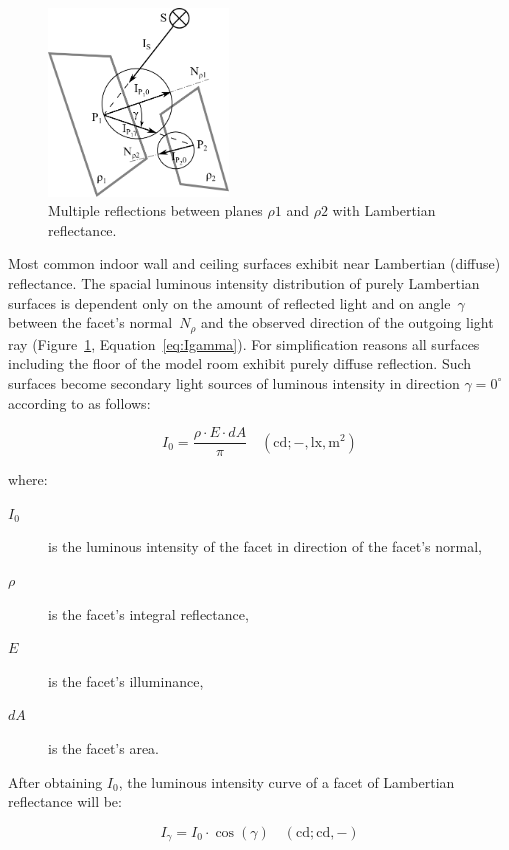 \begin{figure}[htb]
  \centering
  \includegraphics[width=136pt]{diffuseReflection}
  \caption{Multiple reflections between planes $\rho1$ and $\rho2$ with Lambertian reflectance.}
  \label{fig:difRefl}
\end{figure}

Most common indoor wall and ceiling surfaces exhibit near Lambertian (diffuse) reflectance. The spacial luminous intensity distribution of purely Lambertian surfaces is dependent only on the amount of reflected light and on angle~$\gamma$ between the facet's normal~$N_{\rho}$ and the observed direction of the outgoing light ray (Figure~\ref{fig:difRefl}, Equation~\ref{eq:Igamma}). For simplification reasons all surfaces including the floor of the model room exhibit purely diffuse reflection. Such surfaces become secondary light sources of luminous intensity in direction $\gamma=0^{\circ}$ according to \cite{Habel} as follows:

\begin{equation}
I_{0}=\frac{\rho \cdot E \cdot dA}{\pi} \quad \mathrm{(cd;-,lx,m^{2})}
\label{eq:lumInt}
\end{equation}

where:
\begin{description}
	\item[$I_{0}$] is the luminous intensity of the facet in direction of the facet's normal,
	\item[$\rho$] is the facet's integral reflectance,
	\item[$E$] is the facet's illuminance,
	\item[$dA$] is the facet's area.
\end{description}

After obtaining $I_{0}$, the luminous intensity curve of a facet of Lambertian reflectance will be:

\begin{equation}
I_{\gamma}=I_{0} \cdot \cos(\gamma) \quad \mathrm{(cd;cd,-)}
\label{eq:Igamma}
\end{equation}


